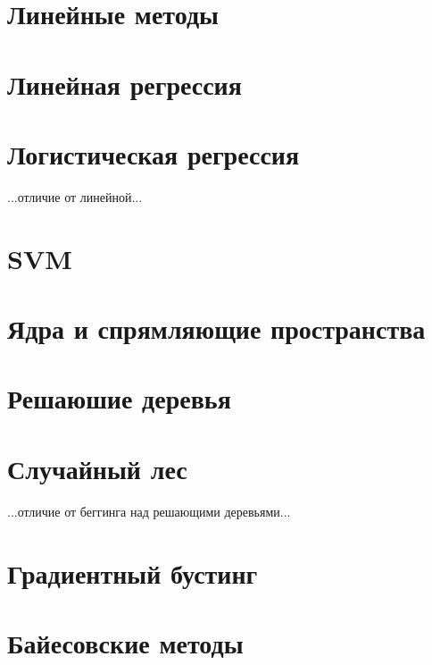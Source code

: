 \section{Линейные методы}


\section{Линейная регрессия}


\section{Логистическая регрессия}

...отличие от линейной...


\section{SVM}


\section{Ядра и спрямляющие пространства}


\section{Решаюшие деревья}


\section{Случайный лес}

...отличие от беггинга над решающими деревьями...


\section{Градиентный бустинг}


\section{Байесовские методы}



